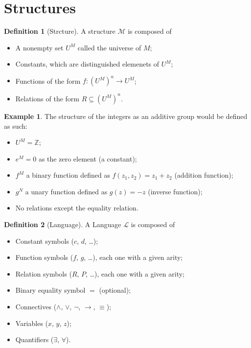 \documentclass[11pt,a4paper]{article}
\theoremstyle{definition}
\newtheorem{definition}{Definition}[section]
\newtheorem{example}{Example}[section]
\theoremstyle{plain}
\newcommand{\Z}{\mathbb{Z}}
\renewcommand{\implies}{\rightarrow}
\begin{document}
  \section{Structures}
  \begin{definition}[Strcture]
    A structure $\mathcal M$ is composed of
    \begin{itemize}
      \item A nonempty set $U^M$ called the universe of $M$;
      \item Constants, which are distinguished elemenets of $U^M$;
      \item Functions of the form $f \colon (U^M)^n \to U^M$;
      \item Relations of the form $R \subseteq (U^M)^n$.
    \end{itemize}
  \end{definition}

  \begin{example}
    The structure of the integers as an additive group would be defined
    as such:
    \begin{itemize}
      \item $U^M = \Z$;
      \item $e^M = 0$ as the zero element (a constant);
      \item $f^M$ a binary function defined as $f(z_1,z_2) = z_1 + z_2$ 
        (addition function);
      \item $g^N$ a unary function defined as $g(z) = -z$ (inverse function);
      \item No relations except the equality relation.
    \end{itemize}
  \end{example}

  \begin{definition}[Language]
    A Language $\mathcal L$ is composed of
    \begin{itemize}
      \item Constant symbols ($c$, $d$, \dots);
      \item Function symbols ($f$, $g$, \dots), each one with a given arity;
      \item Relation symbols ($R$, $P$, \dots), each one with a given arity;
      \item Binary equality symbol $=$ (optional);
      \item Connectives ($\land$, $\lor$, $\neg$, $\implies$, $\equiv$);
      \item Variables ($x$, $y$, $z$);
      \item Quantifiers ($\exists$, $\forall$).
    \end{itemize}
  \end{definition}
\end{document}
